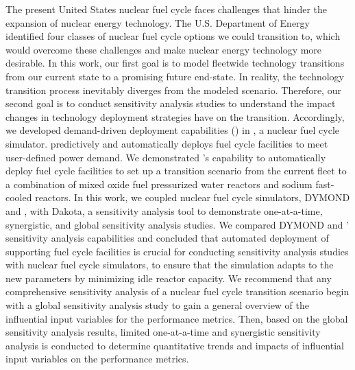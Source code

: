 The present United States nuclear fuel cycle faces challenges that hinder 
the expansion of nuclear energy technology. 
The U.S. Department of Energy identified four classes of nuclear fuel cycle 
options we could transition to, which would overcome these challenges 
and make nuclear energy technology more desirable. 
In this work, our first goal is to model fleetwide technology
transitions from our current
state to a promising future end-state.
In reality, the technology transition process inevitably diverges from the 
modeled scenario. 
Therefore, our second goal is to conduct sensitivity analysis 
studies to understand the impact changes in technology deployment 
strategies have on the transition. 
Accordingly, we developed demand-driven deployment capabilities 
(\deploy) in \Cyclus, a nuclear fuel cycle simulator. 
\deploy predictively and automatically deploys fuel cycle facilities 
to meet user-defined power demand.
We demonstrated \deploy's capability to automatically deploy fuel 
cycle facilities to set up a transition scenario from the current 
fleet to a combination of mixed oxide fuel pressurized water reactors 
and sodium fast-cooled reactors. 
In this work, we coupled nuclear fuel cycle simulators, DYMOND 
and \Cyclus, with Dakota, a sensitivity analysis tool to demonstrate 
one-at-a-time, synergistic, and global sensitivity analysis studies.
We compared DYMOND and \Cyclus' sensitivity analysis capabilities 
and concluded that automated deployment of supporting fuel cycle 
facilities is crucial for conducting sensitivity analysis studies 
with nuclear fuel cycle simulators, to ensure that the simulation 
adapts to the new parameters by minimizing idle reactor capacity. 
We recommend that any comprehensive sensitivity analysis of a 
nuclear fuel cycle transition scenario begin with a global 
sensitivity analysis study to gain a general overview of the 
influential input variables for the performance metrics. 
Then, based on the global sensitivity analysis results, limited 
one-at-a-time and synergistic sensitivity analysis is conducted 
to determine quantitative trends and impacts of influential 
input variables on the performance metrics.
